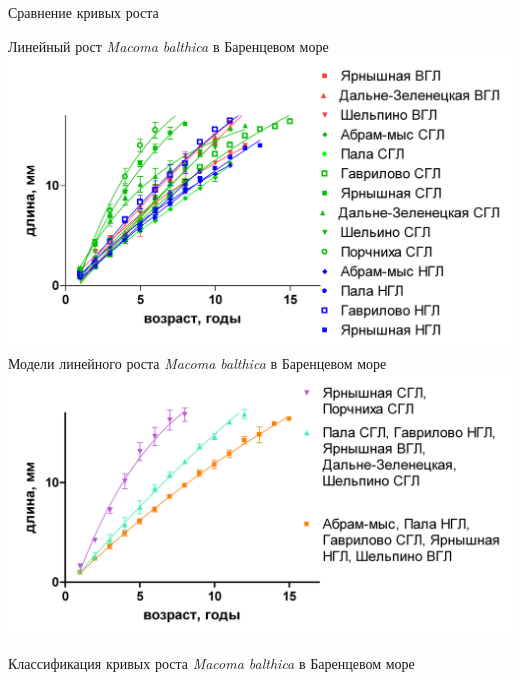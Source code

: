 \documentclass{beamer}
\begin{document}
\begin{frame}{Сравнение кривых роста}
	\begin{minipage}[t]{.6\linewidth}
\begin{center}
	\tiny{Линейный рост {\it Macoma balthica} в Баренцевом море}\\
			\includegraphics[width=\textwidth]{Rost_gorizonts_all.jpg}\\
	\tiny{Модели линейного роста {\it Macoma balthica} в Баренцевом море}\\
			\includegraphics[width=\textwidth]{rost_clusters_all.jpg}
\end{center}
	\end{minipage}
	\begin{minipage}[t]{.3\linewidth}
	\tiny{Классификация кривых роста {\it Macoma balthica} в Баренцевом море}

\end{minipage}
\end{frame}
\end{document}
